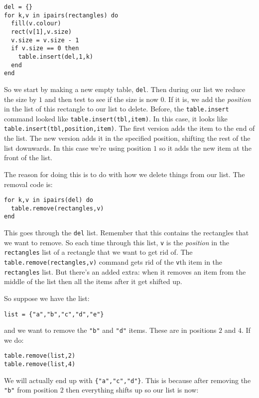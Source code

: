 \documentclass[
  xhtml,%
  use filename%
]{internet}
\begin{document}
\begin{verbatim}
del = {}
for k,v in ipairs(rectangles) do
  fill(v.colour)
  rect(v[1],v.size)
  v.size = v.size - 1
  if v.size == 0 then
    table.insert(del,1,k)
  end
end
\end{verbatim}

So we start by making a new empty table, \verb+del+.
Then during our list we reduce the size by \(1\) and then test to see if the size is now \(0\).
If it is, we add the \emph{position} in the list of this rectangle to our list to delete.
Before, the \verb+table.insert+ command looked like \verb+table.insert(tbl,item)+.
In this case, it looks like \verb+table.insert(tbl,position,item)+.
The first version adds the item to the end of the list.
The new version adds it in the specified position, shifting the rest of the list downwards.
In this case we're using position \(1\) so it adds the new item at the front of the list.

The reason for doing this is to do with how we delete things from our list.
The removal code is:

\begin{verbatim}
for k,v in ipairs(del) do
  table.remove(rectangles,v)
end
\end{verbatim}

This goes through the \verb+del+ list.
Remember that this contains the rectangles that we want to remove.
So each time through this list, \verb+v+ is the \emph{position} in the \verb+rectangles+ list of a rectangle that we want to get rid of.
The \verb+table.remove(rectangles,v)+ command gets rid of the \verb+v+th item in the \verb+rectangles+ list.
But there's an added extra: when it removes an item from the middle of the list then all the items after it get shifted up.

So suppose we have the list:

\begin{verbatim}
list = {"a","b","c","d","e"}
\end{verbatim}

\noindent and we want to remove the \verb+"b"+ and \verb+"d"+ items.
These are in positions \(2\) and \(4\).
If we do:

\begin{verbatim}
table.remove(list,2)
table.remove(list,4)
\end{verbatim}

We will actually end up with \verb+{"a","c","d"}+.
This is because after removing the \verb+"b"+ from position \(2\) then everything shifts up so our list is now:
\end{document}
